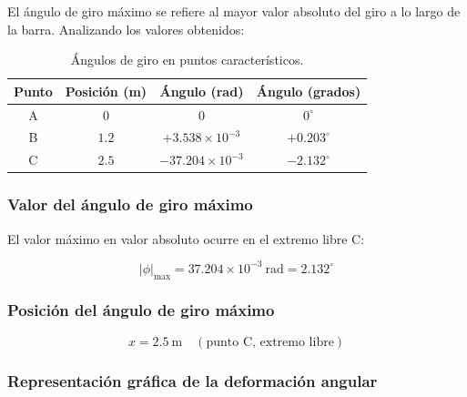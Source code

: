 \documentclass[12pt,a4paper]{article}
\begin{document}
\begin{enumerate}
El ángulo de giro máximo se refiere al mayor valor absoluto del giro a lo largo de la barra. Analizando los valores obtenidos:

\begin{table}[H]
\centering
\begin{tabular}{|c|c|c|c|}
\hline
\textbf{Punto} & \textbf{Posición (m)} & \textbf{Ángulo (rad)} & \textbf{Ángulo (grados)} \\
\hline
A & $0$ & $0$ & $0^\circ$ \\
\hline
B & $1.2$ & $+3.538 \times 10^{-3}$ & $+0.203^\circ$ \\
\hline
C & $2.5$ & $-37.204 \times 10^{-3}$ & $-2.132^\circ$ \\
\hline
\end{tabular}
\caption{Ángulos de giro en puntos característicos.}
\label{tab:angulos_giro}
\end{table}

\subsubsection*{Valor del ángulo de giro máximo}

El valor máximo en valor absoluto ocurre en el extremo libre C:

\begin{equation}
\boxed{|\phi|_{\max}=37.204\times 10^{-3}\ \text{rad}=2.132^\circ}
\end{equation}

\subsubsection*{Posición del ángulo de giro máximo}

\begin{equation}
\boxed{x=2.5\ \text{m}\quad (\text{punto C, extremo libre})}
\end{equation}

\subsubsection*{Representación gráfica de la deformación angular}

\begin{figure}[H]
\centering
{}
\end{figure}
\end{enumerate}
\end{document}
